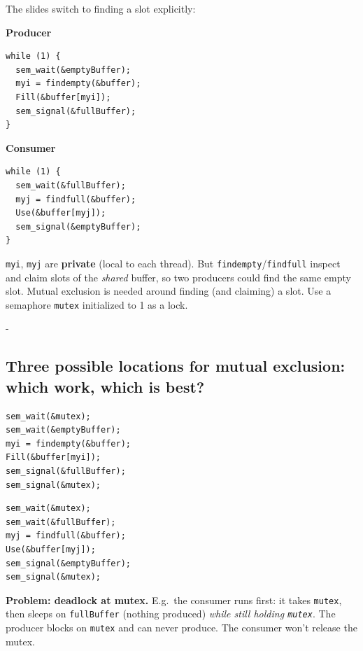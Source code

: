 \documentclass[11pt,a4paper]{article}
\makeatletter
\newcommand{\keepspace}[1]{\par\penalty-100\begingroup
  \setlength{\dimen@}{#1}\dimen@ii\pagegoal\advance\dimen@ii-\pagetotal
  \ifdim\dimen@>\dimen@ii\ifdim\dimen@ii>\z@\vfil\fi\break\fi\endgroup}
\makeatother
\begin{document}
The slides switch to finding a slot explicitly:

\begin{center}
\begin{minipage}[t]{0.47\textwidth}
\textbf{Producer}
\begin{lstlisting}[numbers=none]
while (1) {
  sem_wait(&emptyBuffer);
  myi = findempty(&buffer);
  Fill(&buffer[myi]);
  sem_signal(&fullBuffer);
}
\end{lstlisting}
\end{minipage}\hfill
\begin{minipage}[t]{0.47\textwidth}
\textbf{Consumer}
\begin{lstlisting}[numbers=none]
while (1) {
  sem_wait(&fullBuffer);
  myj = findfull(&buffer);
  Use(&buffer[myj]);
  sem_signal(&emptyBuffer);
}
\end{lstlisting}
\end{minipage}
\end{center}

\begin{quizbox}
\texttt{myi}, \texttt{myj} are \textbf{private} (local to each thread). But
\texttt{findempty}/\texttt{findfull} inspect and claim slots of the
\emph{shared} buffer, so two producers could find the same empty slot.
Mutual exclusion is needed around finding (and claiming) a slot. Use a
semaphore \texttt{mutex} initialized to 1 as a lock.
\end{quizbox}

\keepspace{20\baselineskip}
\subsection{Three possible locations for mutual exclusion: which work, which is best?}

\begin{solbox}
\begin{center}
\begin{minipage}[t]{0.46\textwidth}
\begin{lstlisting}[numbers=none]
sem_wait(&mutex);
sem_wait(&emptyBuffer);
myi = findempty(&buffer);
Fill(&buffer[myi]);
sem_signal(&fullBuffer);
sem_signal(&mutex);
\end{lstlisting}
\end{minipage}\hfill
\begin{minipage}[t]{0.46\textwidth}
\begin{lstlisting}[numbers=none]
sem_wait(&mutex);
sem_wait(&fullBuffer);
myj = findfull(&buffer);
Use(&buffer[myj]);
sem_signal(&emptyBuffer);
sem_signal(&mutex);
\end{lstlisting}
\end{minipage}
\end{center}
\textbf{Problem: deadlock at mutex.} E.g.\ the consumer runs first: it takes
\texttt{mutex}, then sleeps on \texttt{fullBuffer} (nothing produced)
\emph{while still holding \texttt{mutex}}. The producer blocks on
\texttt{mutex} and can never produce. The consumer won't release the mutex.
\end{solbox}
\end{document}
